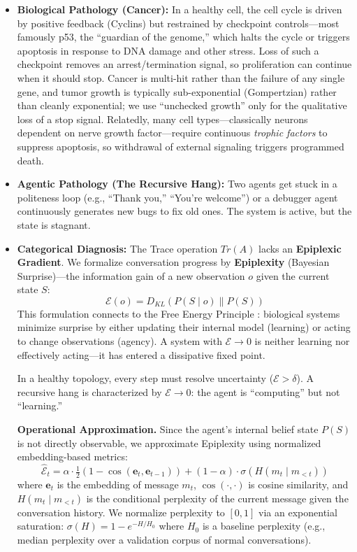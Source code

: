\begin{itemize}[leftmargin=*]
\item \textbf{Biological Pathology (Cancer):} In a healthy cell, the cell cycle is driven by positive feedback
(Cyclins) but restrained by checkpoint controls---most famously p53, the ``guardian of the genome,'' which
halts the cycle or triggers apoptosis in response to DNA damage and other stress. Loss of such a checkpoint
removes an arrest/termination signal, so proliferation can continue when it should stop. Cancer is multi-hit
rather than the failure of any single gene, and tumor growth is typically sub-exponential (Gompertzian) rather
than cleanly exponential; we use ``unchecked growth'' only for the qualitative loss of a stop signal.
Relatedly, many cell types---classically neurons dependent on nerve growth factor---require continuous
\textit{trophic factors} to suppress apoptosis, so withdrawal of external signaling triggers programmed death.
\item \textbf{Agentic Pathology (The Recursive Hang):} Two agents get stuck in a politeness loop (e.g.,
``Thank you,'' ``You're welcome'') or a debugger agent continuously generates new bugs to fix old ones.
The system is active, but the state is stagnant.
\item \textbf{Categorical Diagnosis:} The Trace operation $Tr(A)$ lacks an \textbf{Epiplexic Gradient}. We
formalize conversation progress by \textbf{Epiplexity} (Bayesian Surprise)---the information gain of a new
observation $o$ given the current state $S$:
\begin{equation}
\mathcal{E}(o) = D_{KL}( P(S \mid o) \| P(S) )
\label{eq:epiplexity-kl}
\end{equation}
This formulation connects to the Free Energy Principle \cite{friston2010}: biological systems minimize
surprise by either updating their internal model (learning) or acting to change observations (agency).
A system with $\mathcal{E} \to 0$ is neither learning nor effectively acting---it has entered a
dissipative fixed point.

In a healthy topology, every step must resolve uncertainty ($\mathcal{E} > \delta$). A recursive hang is
characterized by $\mathcal{E} \to 0$: the agent is ``computing'' but not ``learning.''

\textbf{Operational Approximation.} Since the agent's internal belief state $P(S)$ is not directly
observable, we approximate Epiplexity using normalized embedding-based metrics:
\begin{equation}
\hat{\mathcal{E}}_t = \alpha \cdot \tfrac{1}{2}(1 - \cos(\mathbf{e}_{t}, \mathbf{e}_{t-1})) + (1 - \alpha) \cdot \sigma(H(m_t \mid m_{<t}))
\label{eq:epiplexity-approx}
\end{equation}
where $\mathbf{e}_t$ is the embedding of message $m_t$, $\cos(\cdot, \cdot)$ is cosine similarity, and
$H(m_t \mid m_{<t})$ is the conditional perplexity of the current message given the conversation history.
We normalize perplexity to $[0,1]$ via an exponential saturation: $\sigma(H) = 1 - e^{-H/H_0}$ where $H_0$ is a baseline
perplexity (e.g., median perplexity over a validation corpus of normal conversations).


\end{itemize}
